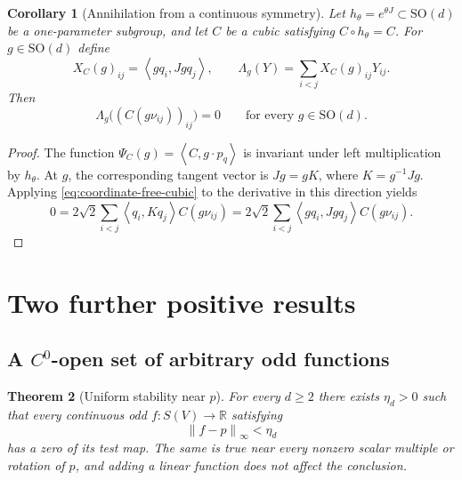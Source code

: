 \documentclass[11pt,reqno]{amsart}
\newtheorem{theorem}{Theorem}[section]
\newtheorem{corollary}[theorem]{Corollary}
\theoremstyle{definition}
\theoremstyle{remark}
\newcommand{\R}{\mathbb R}
\newcommand{\SO}{\mathrm{SO}}
\newcommand{\ip}[2]{\left\langle #1,#2\right\rangle}
\newcommand{\norm}[1]{\left\lVert #1\right\rVert}
\begin{document}
\begin{corollary}[Annihilation from a continuous symmetry]\label{cor:symmetry-annihilation}
Let $h_\theta=e^{\theta J}\subset\SO(d)$ be a one-parameter subgroup, and let
$C$ be a cubic satisfying $C\circ h_\theta=C$.  For $g\in\SO(d)$ define
\[
X_C(g)_{ij}=\ip{gq_i}{Jgq_j},
\qquad
\Lambda_g(Y)=\sum_{i<j}X_C(g)_{ij}Y_{ij}.
\]
Then
\begin{equation}\label{eq:global-annihilation}
\Lambda_g\bigl((C(g\nu_{ij}))_{ij}\bigr)=0
\qquad\text{for every }g\in\SO(d).
\end{equation}
\end{corollary}

\begin{proof}
The function $\Psi_C(g)=\ip{C}{g\cdot p_q}$ is invariant under left
multiplication by $h_\theta$.  At $g$, the corresponding tangent vector is
$Jg=gK$, where $K=g^{-1}Jg$.  Applying \eqref{eq:coordinate-free-cubic} to the
derivative in this direction yields
\[
0=2\sqrt2\sum_{i<j}\ip{q_i}{Kq_j}C(g\nu_{ij})
 =2\sqrt2\sum_{i<j}\ip{gq_i}{Jgq_j}C(g\nu_{ij}).
\]
\end{proof}

\section{Two further positive results}\label{sec:positive}

\subsection{A \texorpdfstring{$C^0$}{C0}-open set of arbitrary odd functions}

\begin{theorem}[Uniform stability near \texorpdfstring{$p$}{p}]\label{thm:uniform-stability}
For every $d\ge2$ there exists $\eta_d>0$ such that every continuous odd
$f\colon S(V)\to\R$ satisfying
\[
\norm{f-p}_\infty<\eta_d
\]
has a zero of its test map.  The same is true near every nonzero scalar
multiple or rotation of $p$, and adding a linear function does not affect the
conclusion.
\end{theorem}
\end{document}
